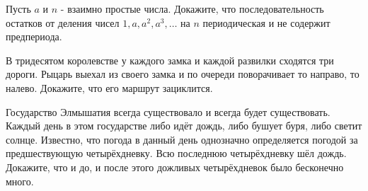 \newpage

\hspace{3mm}

Пусть $a$ и $n$ - взаимно простые числа. Докажите, что последовательность остатков от деления чисел $1, a, a^2, a^3, \ldots$ на $n$ периодическая и не содержит предпериода.

В тридесятом королевстве у каждого замка и каждой развилки сходятся три дороги. Рыцарь выехал из своего замка и по очереди поворачивает то направо, то налево. Докажите, что его маршрут зациклится.

Государство Элмышатия всегда существовало и всегда будет существовать. Каждый день в этом государстве либо идёт дождь, либо бушует буря, либо светит солнце. Известно, что погода в данный день однозначно определяется погодой за предшествующую четырёхдневку. Всю последнюю четырёхдневку шёл дождь. Докажите, что и до, и после этого дожливых четырёхдневок было бесконечно много.